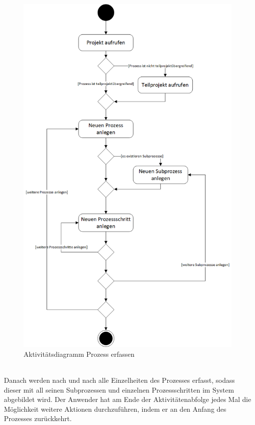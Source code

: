 \begin{figure}[h!]
    \centering
    \includegraphics[scale=0.67]{./Bilder/AD4_ProzessErfassen.png}
    \caption[Aktivitätsdiagramm Anwendungsfall 4]{Aktivitätsdiagramm Prozess erfassen}
    \label{fig:AD4}
\end{figure}
\\Danach werden nach und nach alle Einzelheiten des Prozesses erfasst, sodass dieser mit all seinen Subprozessen und einzelnen Prozessschritten im System abgebildet wird. Der Anwender hat am Ende der Aktivitätenabfolge jedes Mal die Möglichkeit weitere Aktionen durchzuführen, indem er an den Anfang des Prozesses zurückkehrt.

